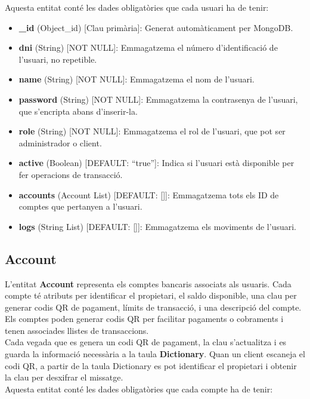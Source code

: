 \documentclass[a4paper,12pt,twoside]{ThesisStyle}
\begin{document}
Aquesta entitat conté les dades obligatòries que cada usuari ha de tenir:

\begin{itemize}
    \item \textbf{\_id} (Object\_id) [Clau primària]: Generat automàticament per MongoDB.
    \item \textbf{dni} (String) [NOT NULL]: Emmagatzema el número d'identificació de l'usuari, no repetible.
    \item \textbf{name} (String) [NOT NULL]: Emmagatzema el nom de l'usuari.
    \item \textbf{password} (String) [NOT NULL]: Emmagatzema la contrasenya de l'usuari, que s'encripta abans d'inserir-la.
    \item \textbf{role} (String) [NOT NULL]: Emmagatzema el rol de l'usuari, que pot ser administrador o client.
    \item \textbf{active} (Boolean) [DEFAULT: ``true'']: Indica si l'usuari està disponible per fer operacions de transacció.
    \item \textbf{accounts} (Account List) [DEFAULT: []]: Emmagatzema tots els ID de comptes que pertanyen a l'usuari.
    \item \textbf{logs} (String List) [DEFAULT: []]: Emmagatzema els moviments de l'usuari.
\end{itemize}


\subsection{Account}
\label{subsec: Account}


L'entitat \textbf{Account} representa els comptes bancaris associats als usuaris. Cada compte té atributs per identificar el propietari, el saldo disponible, una clau per generar codis QR de pagament, límits de transacció, i una descripció del compte. Els comptes poden generar codis QR per facilitar pagaments o cobraments i tenen associades llistes de transaccions.\\

Cada vegada que es genera un codi QR de pagament, la clau s'actualitza i es guarda la informació necessària a la taula \textbf{Dictionary}. Quan un client escaneja el codi QR, a partir de la taula Dictionary es pot identificar el propietari i obtenir la clau per desxifrar el missatge.\\

Aquesta entitat conté les dades obligatòries que cada compte ha de tenir:
\end{document}
